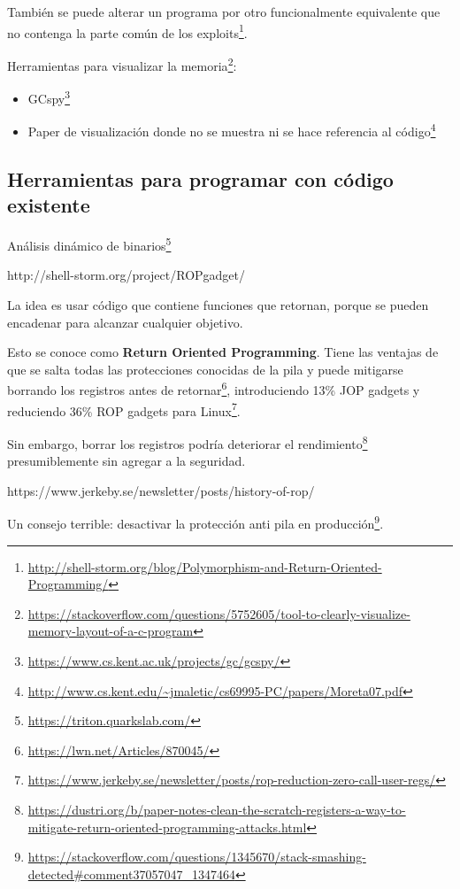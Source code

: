 \documentclass[
  12,
]{scrartcl}
\DeclareRobustCommand{\href}[2]{#2\footnote{\url{#1}}}
\providecommand{\tightlist}{%
  \setlength{\itemsep}{0pt}\setlength{\parskip}{0pt}}
\begin{document}
También
\href{http://shell-storm.org/blog/Polymorphism-and-Return-Oriented-Programming/}{se
puede alterar un programa por otro funcionalmente equivalente que no
contenga la parte común de los exploits}.

\href{https://stackoverflow.com/questions/5752605/tool-to-clearly-visualize-memory-layout-of-a-c-program}{Herramientas
para visualizar la memoria}:

\begin{itemize}
\tightlist
\item
  \href{https://www.cs.kent.ac.uk/projects/gc/gcspy/}{GCspy}
\item
  \href{http://www.cs.kent.edu/~jmaletic/cs69995-PC/papers/Moreta07.pdf}{Paper
  de visualización donde no se muestra ni se hace referencia al código}
\end{itemize}

\hypertarget{herramientas-para-programar-con-cuxf3digo-existente}{%
\subsection{Herramientas para programar con código
existente}\label{herramientas-para-programar-con-cuxf3digo-existente}}

\href{https://triton.quarkslab.com/}{Análisis dinámico de binarios}

http://shell-storm.org/project/ROPgadget/

La idea es usar código que contiene funciones que retornan, porque se
pueden encadenar para alcanzar cualquier objetivo.

Esto se conoce como \textbf{Return Oriented Programming}. Tiene las
ventajas de que se salta todas las protecciones conocidas de la pila y
puede mitigarse \href{https://lwn.net/Articles/870045/}{borrando los
registros antes de retornar},
\href{https://www.jerkeby.se/newsletter/posts/rop-reduction-zero-call-user-regs/}{introduciendo
13\% JOP gadgets y reduciendo 36\% ROP gadgets para Linux}.

Sin embargo,
\href{https://dustri.org/b/paper-notes-clean-the-scratch-registers-a-way-to-mitigate-return-oriented-programming-attacks.html}{borrar
los registros podría deteriorar el rendimiento} presumiblemente sin
agregar a la seguridad.

https://www.jerkeby.se/newsletter/posts/history-of-rop/

\href{https://stackoverflow.com/questions/1345670/stack-smashing-detected\#comment37057047_1347464}{Un
consejo terrible: desactivar la protección anti pila en producción}.
\end{document}
